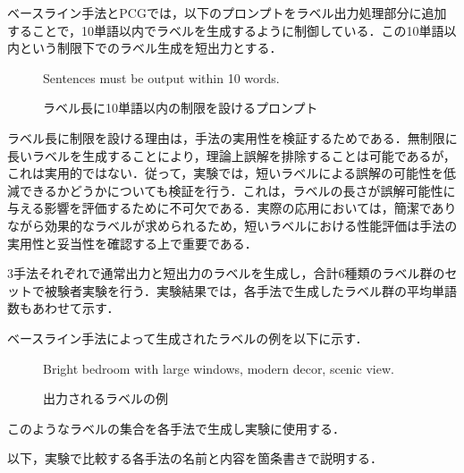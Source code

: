 \documentclass[a4paper,11pt]{jreport}
\begin{document}
ベースライン手法とPCGでは，以下のプロンプトをラベル出力処理部分に追加することで，10単語以内でラベルを生成するように制御している．この10単語以内という制限下でのラベル生成を短出力とする．

\begin{figure}[H]
\begin{mdframed}[linewidth=1pt]
Sentences must be output within 10 words.
\end{mdframed}
\caption{ラベル長に10単語以内の制限を設けるプロンプト}
\label{fig:limiting_prompt}
\end{figure}


ラベル長に制限を設ける理由は，手法の実用性を検証するためである．無制限に長いラベルを生成することにより，理論上誤解を排除することは可能であるが，これは実用的ではない．従って，実験では，短いラベルによる誤解の可能性を低減できるかどうかについても検証を行う．これは，ラベルの長さが誤解可能性に与える影響を評価するために不可欠である．実際の応用においては，簡潔でありながら効果的なラベルが求められるため，短いラベルにおける性能評価は手法の実用性と妥当性を確認する上で重要である．

3手法それぞれで通常出力と短出力のラベルを生成し，合計6種類のラベル群のセットで被験者実験を行う．実験結果では，各手法で生成したラベル群の平均単語数もあわせて示す．

ベースライン手法によって生成されたラベルの例を以下に示す．

\begin{figure}[H]
\begin{mdframed}[linewidth=1pt]
Bright bedroom with large windows, modern decor, scenic view.
\end{mdframed}
\caption{出力されるラベルの例}
\label{fig:label_example}
\end{figure}

このようなラベルの集合を各手法で生成し実験に使用する．

以下，実験で比較する各手法の名前と内容を箇条書きで説明する．
\end{document}
